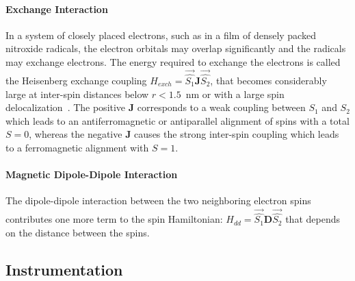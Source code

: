 \paragraph*{Exchange Interaction}
In a system of closely placed electrons, such as in a film of densely packed nitroxide radicals, the electron orbitals may overlap significantly and the radicals may exchange electrons. The energy required to exchange the electrons is called the Heisenberg exchange coupling $H_{exch} = \vec{\hat{S_1}}\textbf{J}\vec{\hat{S_2}}$, that becomes considerably large at inter-spin distances below $r<1.5$~nm or with a large spin delocalization~\cite{Schweiger2001_exch}. The positive $\textbf{J}$ corresponds to a weak coupling between $S_1$ and $S_2$ which leads to an antiferromagnetic or antiparallel alignment of spins with a total $S=0$, whereas the negative $\textbf{J}$ causes the strong inter-spin coupling which leads to a ferromagnetic alignment with $S=1$.

\paragraph*{Magnetic Dipole-Dipole Interaction}
The dipole-dipole interaction between the two neighboring electron spins contributes one more term to the spin Hamiltonian: $H_{dd} = \vec{\hat{S_1}}\textbf{D}\vec{\hat{S_2}}$ that depends on the distance between the spins. 

\subsection{Instrumentation}
